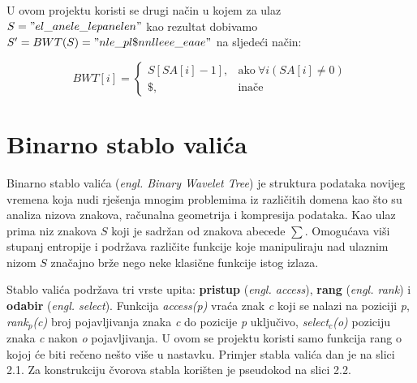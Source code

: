 \documentclass[times, utf8, seminar, numeric]{fer}
\begin{document}
U ovom projektu koristi se drugi način u kojem za ulaz $S = "el\_anele\_lepanelen"$ kao rezultat dobivamo $S' = BWT(S) = "nle\_pl\$nnlleee\_eaae"$ na sljedeći način:

\begin{equation}\label{bwt}
BWT[i] = 
\begin{cases}
S[SA[i] - 1], & \text{ako}\ \forall{i}(SA[i] \neq 0)\\
\$, & \text{inače}
\end{cases}
\end{equation}

\section {Binarno stablo valića}
Binarno stablo valića (\textit{engl. Binary Wavelet Tree}) je struktura podataka novijeg vremena koja nudi rješenja mnogim problemima iz različitih domena kao što su analiza nizova znakova, računalna geometrija i kompresija podataka. Kao ulaz prima niz znakova $S$ koji je sadržan od znakova abecede $\sum$. Omogućava viši stupanj entropije i podržava različite funkcije koje manipuliraju nad ulaznim nizom $S$ značajno brže nego neke klasične funkcije istog izlaza. \cite{wt_book}
\par Stablo valića podržava tri vrste upita: \textbf{pristup} (\textit{engl. access}), \textbf{rang} (\textit{engl. rank}) i \textbf{odabir} (\textit{engl. select}). Funkcija \textit{access(p)} vraća znak \textit{c} koji se nalazi na poziciji \textit{p}, \textit{rank$_p$(c)} broj pojavljivanja znaka \textit{c} do pozicije \textit{p} uključivo, \textit{select$_c$(o)} poziciju znaka \textit{c} nakon \textit{o} pojavljivanja. U ovom se projektu koristi samo funkcija rang o kojoj će biti rečeno nešto više u nastavku.\cite{wt_book} Primjer stabla valića dan je na slici 2.1.
Za konstrukciju čvorova stabla korišten je pseudokod na slici 2.2.
\end{document}
